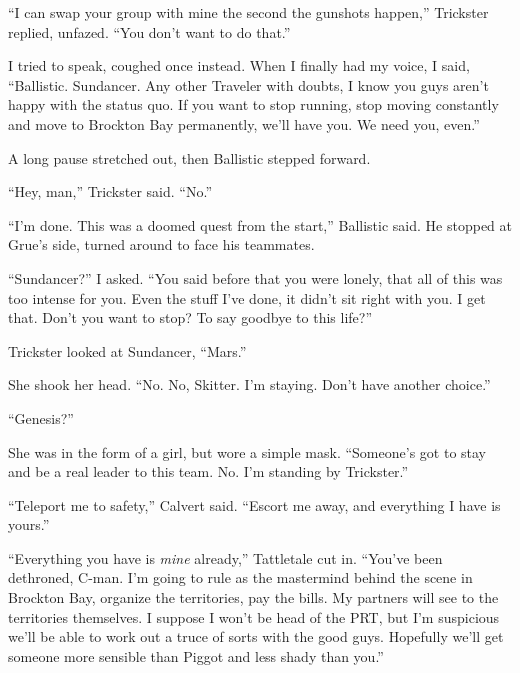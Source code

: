 ``I can swap your group with mine the second the gunshots happen,'' Trickster replied, unfazed.  ``You don't want to do that.''



I tried to speak, coughed once instead.  When I finally had my voice, I said, ``Ballistic.  Sundancer.  Any other Traveler with doubts, I know you guys aren't happy with the status quo.  If you want to stop running, stop moving constantly and move to Brockton Bay permanently, we'll have you.  We need you, even.''



A long pause stretched out, then Ballistic stepped forward.



``Hey, man,'' Trickster said.  ``No.''



``I'm done.  This was a doomed quest from the start,'' Ballistic said.  He stopped at Grue's side, turned around to face his teammates.



``Sundancer?'' I asked.  ``You said before that you were lonely, that all of this was too intense for you.  Even the stuff I've done, it didn't sit right with you.  I get that.  Don't you want to stop?  To say goodbye to this life?''



Trickster looked at Sundancer, ``Mars.''



She shook her head.  ``No.  No, Skitter.  I'm staying.  Don't have another choice.''



``Genesis?''



She was in the form of a girl, but wore a simple mask.  ``Someone's got to stay and be a real leader to this team.  No.  I'm standing by Trickster.''



``Teleport me to safety,'' Calvert said.  ``Escort me away, and everything I have is yours.''



``Everything you have is \emph{mine }already,'' Tattletale cut in.  ``You've been dethroned, C-man.  I'm going to rule as the mastermind behind the scene in Brockton Bay, organize the territories, pay the bills.  My partners will see to the territories themselves.  I suppose I won't be head of the PRT, but I'm suspicious we'll be able to work out a truce of sorts with the good guys.  Hopefully we'll get someone more sensible than Piggot and less shady than you.''



